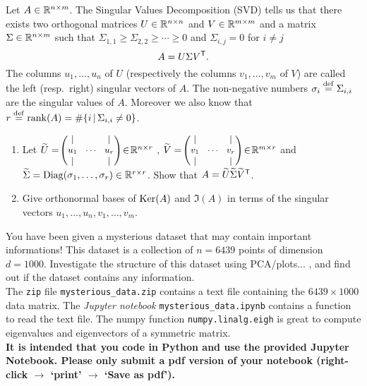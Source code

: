 \documentclass[11pt,nocut]{article}
\begin{document}
\newpage

\begin{problem}[2 points]
	Let $A \in \mathbb{R}^{n \times m}$. The Singular Values Decomposition (SVD) tells us that there exists two orthogonal matrices $U \in \mathbb{R}^{n \times n}$ and $V \in \mathbb{R}^{m \times m}$ and a matrix $\Sigma \in \mathbb{R}^{n \times m}$ such that $\Sigma_{1,1} \geq \Sigma_{2,2}  \geq \cdots \geq 0$ and $\Sigma_{i,j} = 0$ for $i\neq j$
	$$
	A = U \Sigma V^{{\sf T}}.
	$$
	The columns $u_1, \dots, u_n$ of $U$ (respectively the columns $v_1, \dots, v_m$ of $V$) are called the left (resp.\ right) singular vectors of $A$. The non-negative numbers $\sigma_i \overset{\rm def}{=} \Sigma_{i,i}$ are the singular values of $A$. Moreover we also know that $r \overset{\rm def}{=} {{\rm rank}}(A) = \# \{i \, | \, \Sigma_{i,i} \neq 0 \}$.
	\begin{enumerate}[label=\normalfont(\textbf{\alph*})]
		\item Let 
			$\widetilde{U} = \!
			{\small \begin{pmatrix}
					| & & | \\
					u_1 & \!\cdots\! & u_r \\
					| & & | 
			\end{pmatrix} } \! \in \! \mathbb{R}^{n \times r}$ ,
			$\widetilde{V} = \!
			{\small \begin{pmatrix}
					| & & | \\
					v_1 & \!\cdots\! & v_r \\
					| & & | 
			\end{pmatrix} } \! \in \! \mathbb{R}^{m \times r}$ and
			$\widetilde{\Sigma} = {{\rm Diag}}(\sigma_1, \dots, \sigma_r) \in \mathbb{R}^{r \times r}$.
			Show that $A = \widetilde{U}\widetilde{\Sigma}\widetilde{V}^{{\sf T}}$.
		\item Give orthonormal bases of ${{\rm Ker}}(A)$ and $\Im(A)$ in terms of the singular vectors $u_1, \dots, u_n, v_1, \dots , v_m$.
	\end{enumerate}
\end{problem}

\vspace{5mm}

\begin{problem}[3 points]
	You have been given a mysterious dataset that may contain important informations! This dataset is a collection of $n=6439$ points of dimension $d=1000$.
	Investigate the structure of this dataset using PCA/plots... , and find out if the dataset contains any information.
	\\

	The \texttt{zip} file \texttt{mysterious\_data.zip} contains a text file containing the $6439\times 1000$ data matrix.
	The \emph{Jupyter notebook} \texttt{mysterious\_data.ipynb} contains a function to read the text file.
	The numpy function \texttt{numpy.linalg.eigh} is great to compute eigenvalues and eigenvectors of a symmetric matrix. 
	\\

	\textbf{It is intended that you code in Python and use the provided Jupyter Notebook. Please only submit a pdf version of your notebook (right-click $\to$ `print' $\to$ `Save as pdf').}
\end{problem}
\end{document}
